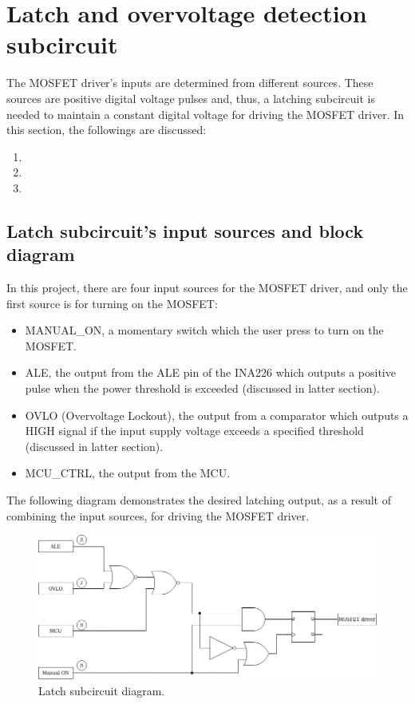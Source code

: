 \documentclass[../main.tex]{subfiles}
\begin{document}
    \section{Latch and overvoltage detection subcircuit}
    The MOSFET driver's inputs are determined from different sources. These sources are positive digital voltage pulses and, thus, a latching subcircuit is needed to maintain a constant digital voltage for driving the MOSFET driver. In this section, the followings are discussed:
    \begin{enumerate}
        \item {}
        \item {}
        \item {}
    \end{enumerate}

    \pagebreak
    \subsection{Latch subcircuit's input sources and block diagram} \label{ssec:latch_input_src}
    In this project, there are four input sources for the MOSFET driver, and only the first source is for turning on the MOSFET:
    \begin{itemize}
        \item MANUAL\_ON, a momentary switch which the user press to turn on the MOSFET.
        \item ALE, the output from the ALE pin of the INA226 which outputs a positive pulse when the power threshold is exceeded (discussed in latter section).
        \item OVLO (Overvoltage Lockout), the output from a comparator which outputs a HIGH signal if the input supply voltage exceeds a specified threshold (discussed in latter section).
        \item MCU\_CTRL, the output from the MCU.
    \end{itemize}

    \justify
    The following diagram demonstrates the desired latching output, as a result of combining the input sources, for driving the MOSFET driver.

    \begin{figure}[!h]
        \centerline{\includegraphics[width=\linewidth]{media/latch_circuit_diagram.png}}
        \caption{Latch subcircuit diagram.}
        \label{fig:latch_circuit_diagram}
    \end{figure} 
\end{document}
